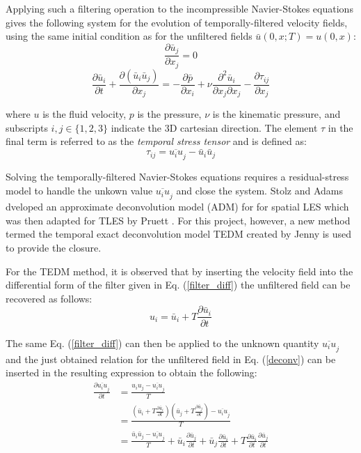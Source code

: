 Applying such a filtering operation to the incompressible Navier-Stokes equations gives the following system for the evolution of temporally-filtered velocity fields, using the same initial condition as for the unfiltered fields $\bar{u}(0,x;T)=u(0,x)$:
\begin{equation}
\frac{\partial \bar{u}_j}{\partial x_j}=0
\end{equation}
\begin{equation} \label{TFNS}
\frac{\partial \bar{u}_i}{\partial t}+\frac{\partial (\bar{u}_i\bar{u}_j)}{\partial x_j}=-\frac{\partial \bar{p}}{\partial x_i}+\nu \frac{\partial^2 \bar{u}_i}{\partial x_j \partial x_j}-\frac{\partial \tau_{ij}}{\partial x_j}
\end{equation}

where $u$ is the fluid velocity, $p$ is the pressure, $\nu$ is the kinematic pressure, and subscripts $i,j\in\{1,2,3\}$ indicate the 3D cartesian direction. The element $\tau$ in the final term is referred to as the \emph{temporal stress tensor} and is defined as:
\begin{equation}
\tau_{ij}=\overline{u_i u}_j-\bar{u}_i\bar{u}_j
\end{equation}

Solving the temporally-filtered Navier-Stokes equations requires a residual-stress model to handle the unkown value $\overline{u_i u}_j$ and close the system. Stolz and Adams \cite{Stolz2001} dveloped an approximate deconvolution model (ADM) for for spatial LES which was then adapted for TLES by Pruett \cite{Pruett2008}. For this project, however, a new method termed the temporal exact deconvolution model TEDM created by Jenny \cite{Jenny2016} is used to provide the closure.

For the TEDM method, it is observed that by inserting the velocity field into the differential form of the filter given in Eq. (\ref{filter_diff}) the unfiltered field can be recovered as follows:
\begin{equation} \label{deconv}
u_i=\bar{u}_i+T\frac{\partial \bar{u}_i}{\partial t}
\end{equation}

The same Eq. (\ref{filter_diff}) can then be applied to the unknown quantity $\overline{u_i u}_j$ and the just obtained relation for the unfiltered field in Eq. (\ref{deconv}) can be inserted in the resulting expression to obtain the following:
\begin{equation}
\begin{split}
\frac{\partial{\overline{u_i u}_j}}{\partial t}&=\frac{u_i u_j-\overline{u_i u}_j}{T} \\
&=\frac{\left( \bar{u}_i+T\frac{\partial \bar{u}_i}{\partial t} \right) \left( \bar{u}_j+T\frac{\partial \bar{u}_j}{\partial t} \right)-\overline{u_i u}_j}{T} \\
&=\frac{\bar{u}_i \bar{u}_j-\overline{u_i u}_j}{T}+\bar{u}_i\frac{\partial \bar{u}_j}{\partial t}+\bar{u}_j\frac{\partial \bar{u}_i}{\partial t}+T\frac{\partial \bar{u}_i}{\partial t}\frac{\partial \bar{u}_j}{\partial t}
\end{split}
\end{equation}

